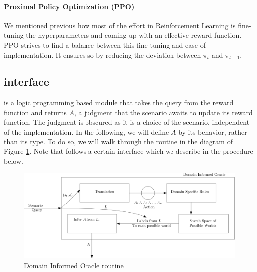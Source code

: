 \paragraph{Proximal Policy Optimization (PPO)}
We mentioned previous how most of the effort in Reinforcement Learning is fine-tuning the hyperparameters 
and coming up with an effective reward function. PPO strives to find a balance between this fine-tuning and ease of implementation. It ensures so 
by reducing the deviation between $\pi_t$ and $\pi_{t+1}$. 


\subsection{\dio interface} \label{scspecs}
\dio is a logic programming based module that takes the query from the reward function and returns $A$, a judgment that the scenario awaits to update its reward function. The judgment is obscured as it is a choice of the scenario, 
independent of the \dio implementation. In the following, we will define $A$ by its behavior, rather than its type. To do so, we will walk through the routine in the diagram of Figure \ref{fig:diospecs}.
Note that \dio follows a certain interface which we describe in the procedure below.

\begin{figure}[H]
  \centering
  \includegraphics[scale=0.46]{figures/diospecs.png}
  \caption{Domain Informed Oracle routine}
  \label{fig:diospecs}
\end{figure}

